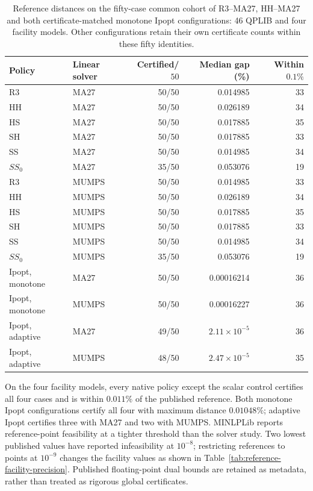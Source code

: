 \documentclass[pdflatex,sn-mathphys-num]{sn-jnl}
\theoremstyle{thmstyleone}
\theoremstyle{thmstylethree}
\begin{document}
\begin{table}[t]
\centering\small
\caption{Reference distances on the fifty-case common cohort of R3--MA27,
HH--MA27 and both certificate-matched monotone Ipopt configurations:
46 QPLIB and four facility models. Other configurations retain their own
certificate counts within these fifty identities.}
\label{tab:published-reference-common}

\begin{tabular}{@{}llrrr@{}}
\toprule
Policy & Linear solver & Certified/$50$ & Median gap (\%) & Within $0.1\%$\\
\midrule
R3 & MA27 & 50/50 & 0.014985 & 33\\
HH & MA27 & 50/50 & 0.026189 & 34\\
HS & MA27 & 50/50 & 0.017885 & 35\\
SH & MA27 & 50/50 & 0.017885 & 33\\
SS & MA27 & 50/50 & 0.014985 & 34\\
$SS_0$ & MA27 & 35/50 & 0.053076 & 19\\
R3 & MUMPS & 50/50 & 0.014985 & 33\\
HH & MUMPS & 50/50 & 0.026189 & 34\\
HS & MUMPS & 50/50 & 0.017885 & 35\\
SH & MUMPS & 50/50 & 0.017885 & 33\\
SS & MUMPS & 50/50 & 0.014985 & 34\\
$SS_0$ & MUMPS & 35/50 & 0.053076 & 19\\
Ipopt, monotone & MA27 & 50/50 & 0.00016214 & 36\\
Ipopt, monotone & MUMPS & 50/50 & 0.00016227 & 36\\
Ipopt, adaptive & MA27 & 49/50 & $2.11\times10^{-5}$ & 36\\
Ipopt, adaptive & MUMPS & 48/50 & $2.47\times10^{-5}$ & 35\\
\bottomrule
\end{tabular}


\end{table}

On the four facility models, every native policy except the scalar control
certifies all four cases and is within $0.011\%$ of the published reference.
Both monotone Ipopt configurations certify all four with maximum distance
$0.01048\%$; adaptive Ipopt certifies three with MA27 and two with MUMPS.
MINLPLib reports reference-point feasibility
at a tighter threshold than the solver study. Two lowest published values
have reported infeasibility at $10^{-8}$; restricting references to points
at $10^{-9}$ changes the facility values as shown in
Table~\ref{tab:reference-facility-precision}. Published floating-point dual
bounds are retained as metadata, rather than treated as rigorous global
certificates.
\end{document}
